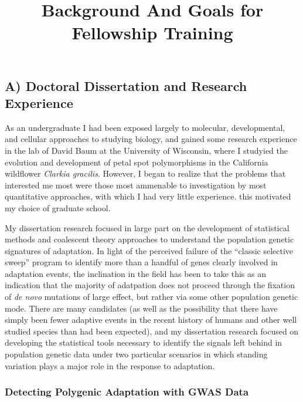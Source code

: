 \documentclass[11pt]{article}
\title{Background And Goals for Fellowship Training}
\date{}
\begin{document}
\maketitle


\subsection*{A) Doctoral Dissertation and Research Experience}

As an undergraduate I had been exposed largely to molecular, developmental, and cellular approaches to studying biology, and gained some research experience in the lab of David Baum at the University of Wisconsin, where I studyied the evolution and development of petal spot polymorphisms in the California wildflower \textit{Clarkia gracilis}. However, I began to realize that the problems that interested me most were those most ammenable to investigation by most quantitative approaches, with which I had very little experience. this motivated my choice of graduate school.

My dissertation research focused in large part on the development of statistical methods and coalescent theory approaches to understand the population genetic signatures of adaptation. In light of the perceived failure of the ``classic selective sweep'' program to identify more than a handful of genes clearly involved in adaptation events, the inclination in the field has been to take this as an indication that the majority of adatpation does not proceed through the fixation of \textit{de novo} mutations of large effect, but rather via some other population genetic mode. There are many candidates (as well as the possibility that there have simply been fewer adaptive events in the recent history of humans and other well studied species than had been expected), and my dissertation research focused on developing the statistical tools necessary to identify the signals left behind in population genetic data under two particular scenarios in which standing variation plays a major role in the response to adaptation.

\subsubsection*{Detecting Polygenic Adaptation with GWAS Data}
\end{document}
